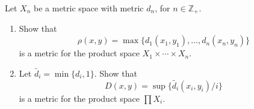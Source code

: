 \begin{exercise}[Munkres 21.3]
  Let $X_n$ be a metric space with metric $d_n$, for $n \in \mathbb{Z}_+$.
  \begin{enumerate}
    \item Show that
      \begin{equation}
        \rho(x,y) = \max\{d_1(x_1, y_1), \ldots, d_n(x_n, y_n)\}
      \end{equation}
      is a metric for the product space $X_1 \times \cdots \times X_n$.
    
    \item Let $\tilde{d_i} = \min\{d_i, 1\}$. Show that
      \begin{equation}
        D(x,y) = \sup\{\tilde{d_i}(x_i, y_i)/i\}
      \end{equation}
      is a metric for the product space $\prod X_i$.
  \end{enumerate}
\end{exercise}
